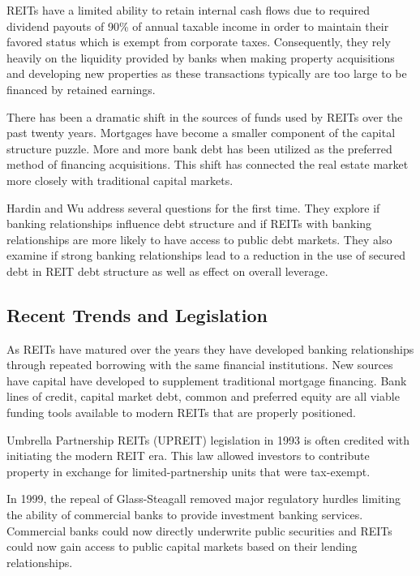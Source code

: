 \documentclass[a4paper, 12pt]{article} %
\begin{document}
REITs have a limited ability to retain internal cash flows due to required dividend payouts of 90\% of annual taxable income in order to maintain their favored status which is exempt from corporate taxes. Consequently,
they rely heavily on the liquidity provided by banks when making property acquisitions and developing new properties as these transactions typically are too large to be financed by retained earnings.

There has been a dramatic shift in the sources of funds used by REITs over the past twenty years. Mortgages have become a smaller component of the capital structure puzzle. More and more bank debt has been utilized as the preferred method of financing acquisitions. This shift has connected the real estate market more closely with traditional capital markets.

Hardin and Wu address several questions for the first time. They explore if banking relationships influence debt structure and if REITs with banking relationships are more likely to have access to public debt markets. They also examine if strong banking relationships lead to a reduction in the use of secured debt in REIT debt structure as well as effect on overall leverage.

\subsection*{Recent Trends and Legislation}

As REITs have matured over the years they have developed banking relationships through repeated borrowing with the same financial institutions. New sources have capital have developed to supplement traditional mortgage financing. Bank lines of credit, capital market debt, common and preferred equity are all viable funding tools available to modern REITs that are properly positioned.

Umbrella Partnership REITs (UPREIT) legislation in 1993 is often credited with initiating the modern REIT era. This law allowed investors to contribute property in exchange for limited-partnership units that were tax-exempt.

In 1999, the repeal of Glass-Steagall removed major regulatory hurdles limiting the ability of commercial banks to provide investment banking services. 
Commercial banks could now directly underwrite public securities 
and REITs could now gain access to public capital markets based on their lending relationships.

\end{document}
